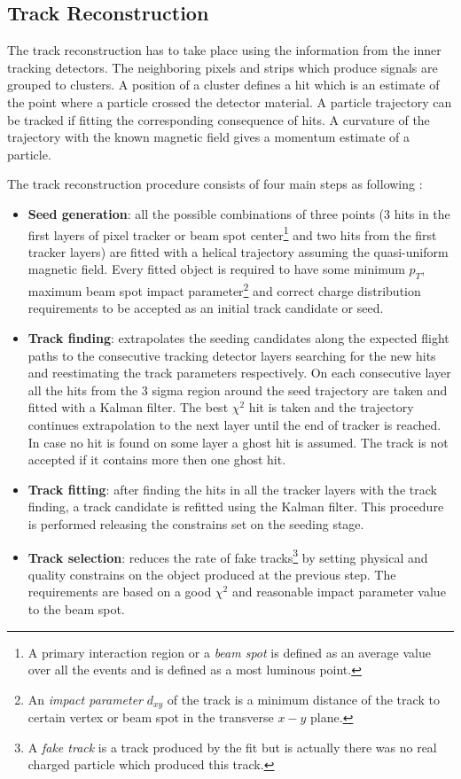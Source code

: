 \subsection{Track Reconstruction}\label{ssec:trkReco}

The track reconstruction has to take place using the information from the inner tracking detectors. The neighboring pixels and strips which
produce signals are grouped to clusters. A position of a cluster defines a hit which is an estimate of the point where a particle crossed the
detector material. A particle trajectory can be tracked if fitting the corresponding consequence of hits. A curvature 
of the trajectory with the known magnetic field gives a momentum estimate of a particle.

The track reconstruction procedure consists of four main steps as following \cite{Chatrchyan:2014fea}:

\begin{itemize}
 \item \textbf{Seed generation}: all the possible combinations of three points (3 hits in the first layers of pixel tracker or beam spot center\footnote
 {A primary interaction region or a \textit{beam spot} is defined as an average value over all the events and is defined as a most luminous point.} and
 two hits from the first tracker layers) are fitted with a helical trajectory assuming the quasi-uniform magnetic field. Every fitted object is required
 to have some minimum $p_{T}$, maximum beam spot impact parameter\footnote{An \textit{impact parameter} $d_{xy}$ of the track is a minimum
 distance of the track to certain vertex or beam spot in the transverse $x-y$ plane.} and correct charge distribution requirements to be accepted
 as an initial track candidate or seed.
 \item \textbf{Track finding}: extrapolates the seeding candidates along the expected flight paths to the consecutive tracking detector layers searching 
 for the new hits and reestimating the track parameters respectively. On each consecutive layer all the hits from the 3 sigma region around the seed trajectory
 are taken and fitted with a Kalman filter\cite{Fruhwirth:1987fm}. The best $\chi^{2}$ hit is taken and the trajectory
 continues extrapolation to the next layer until the end of tracker is reached. In case no hit is found on some layer a ghost hit is assumed. The track is not
 accepted if it contains more then one ghost hit.
 \item \textbf{Track fitting}: after finding the hits in all the tracker layers with the track finding, a track candidate is refitted using the Kalman filter. 
 This procedure is performed releasing the constrains set on the seeding stage.
 \item \textbf{Track selection}: reduces the rate of fake tracks\footnote{A \textit{fake track} is a track produced by the fit but is actually there was
 no real charged particle which produced this track.} by setting physical and quality constrains on the object produced at the previous step. The requirements
 are based on a good $\chi^{2}$ and reasonable impact parameter value to the beam spot.
\end{itemize}

